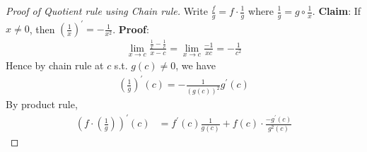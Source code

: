 \begin{proof}[Proof of Quotient rule using Chain rule]
    Write $ \frac{f}{g} = f \cdot \frac{1}{g}$ where 
    $ \frac{1}{g} = g \circ \frac{1}{x}$.
    \textbf{Claim}: If $x \neq 0$, then $ \left(\frac{1}{x}\right)^{\prime} = - \frac{1}{x^{2}}$.
    \textbf{Proof}: 
    \begin{align*}
        \lim_{x \to c} \frac{ \frac{1}{x} - \frac{1}{c} }{x - c} = 
        \lim_{x \to c} \frac{-1}{xc} = - \frac{1}{c^{2}}
    \end{align*}
    Hence by chain rule at $c$ s.t. $g(c) \neq 0$, we have 
    \begin{align*}
        \left( \frac{1}{g} \right)^{\prime}(c) = - \frac{1}{\left(g(c)\right)^{2}}
        g^{\prime}(c)
    \end{align*}
    By product rule, 
    \begin{align*}
        \left(f\cdot \left( \frac{1}{g} \right) \right)^{\prime} (c) 
        &= f^{\prime}(c) \frac{1}{g(c)} + f(c) \cdot \frac{-g^{\prime}(c)}{g^{2}(c)}
    \end{align*}
\end{proof}

